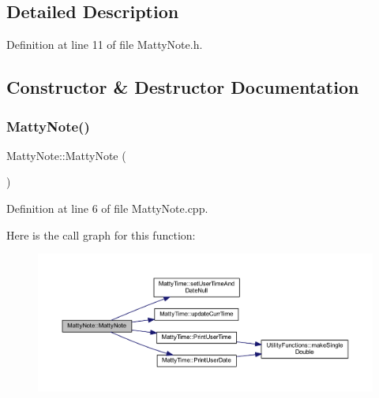 \subsection{Detailed Description}


Definition at line 11 of file Matty\+Note.\+h.



\subsection{Constructor \& Destructor Documentation}
\hypertarget{classMattyNote_a8c09bf366e6973bc1c4f4d5daa792899}{}\label{classMattyNote_a8c09bf366e6973bc1c4f4d5daa792899} 
\subsubsection{\texorpdfstring{Matty\+Note()}{MattyNote()}\hspace{0.1cm}{\footnotesize\ttfamily [1/2]}}
{\footnotesize\ttfamily Matty\+Note\+::\+Matty\+Note (\begin{DoxyParamCaption}{ }\end{DoxyParamCaption})}



Definition at line 6 of file Matty\+Note.\+cpp.

Here is the call graph for this function\+:
\nopagebreak
\begin{figure}[H]
\begin{center}
\leavevmode
\includegraphics[width=350pt]{classMattyNote_a8c09bf366e6973bc1c4f4d5daa792899_cgraph}
\end{center}
\end{figure}
\hypertarget{classMattyNote_a101e9c2475ee2567dfa2e168b543806f}{}\label{classMattyNote_a101e9c2475ee2567dfa2e168b543806f} 

